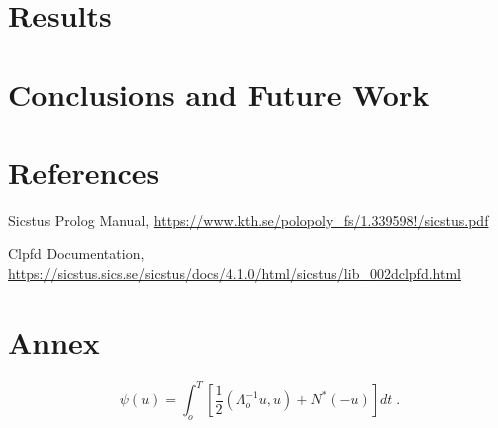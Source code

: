 \documentclass[runningheads,a4paper]{llncs}
\begin{document}
\section{Results}


\section{Conclusions and Future Work}


\section{References}

\begin{thebibliography}{2}

 Sicstus Prolog Manual, \url{https://www.kth.se/polopoly_fs/1.339598!/sicstus.pdf}

 Clpfd Documentation, \url{https://sicstus.sics.se/sicstus/docs/4.1.0/html/sicstus/lib_002dclpfd.html}

\end{thebibliography}


\section{Annex}

\begin{equation}
  \psi (u) = \int_{o}^{T} \left[\frac{1}{2}
  \left(\Lambda_{o}^{-1} u,u\right) + N^{\ast} (-u)\right] dt \;  .
\end{equation}
\end{document}
